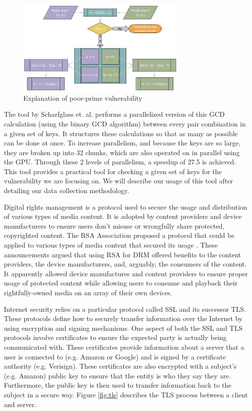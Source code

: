 \documentclass{acm_proc_article-sp}
\begin{document}
\begin{figure}
   \centering
   \includegraphics[width=3.3in]{vulnerability.png}
   \caption{Explanation of poor-prime vulnerability}
   \label{fig:vuln}
\end{figure}

The tool by Scharfglass et. al. \cite{scharfglass2012breaking} performs a
parallelized version of this GCD calculation (using the binary GCD algorithm)
between every pair combination in a given set of keys. It structures these
calculations so that as many as possible can be done at once. To increase
parallelism, and because the keys are so large, they are broken up into 32
chunks, which are also operated on in parallel using the GPU. Through these 2
levels of parallelism, a speedup of 27.5 is achieved. This tool provides a
practical tool for checking a given set of keys for the vulnerability we are
focusing on. We will describe our usage of this tool after detailing our data
collection methodology.

Digital rights management is a protocol used to secure the usage and
distribution of various types of media content. It is adopted by content
providers and device manufacturers to ensure users don't misuse or wrongfully 
share protected, copyrighted content.
The RSA Association proposed a protocol that could be applied to various types
of media content that secured its usage \cite{rsa2004announces,
rsa2004supports}. These announcements argued that using RSA for DRM offered
benefits to the content providers, the device manufacturers, and, arguably, the
consumers of the content. It apparently allowed device manufactures and
content providers to ensure proper usage of protected content while allowing
users to consume and playback their rightfully-owned media on an array of
their own devices.
 
Internet security relies on a particular protocol called SSL and its successor
TLS. These protocols define how to securely transfer information over the
Internet by using encryption and signing mechanisms. One aspect of both the SSL
and TLS protocols involve certificates to ensure the expected party is
actually being communicated with. These certificates provide information
about a server that a user is connected to (e.g. Amazon or Google)
and is signed by a certificate authority (e.g. Verisign). These certificates
are also encrypted with a subject's (e.g. Amazon) public key to ensure that
the entity is who they say they are. Furthermore, the public key is then used 
to transfer information back to the subject in a secure way. Figure
\ref{fig:tls} describes the TLS process between a client and server. 
\end{document}
